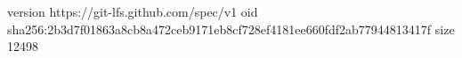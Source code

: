 version https://git-lfs.github.com/spec/v1
oid sha256:2b3d7f01863a8cb8a472ceb9171eb8cf728ef4181ee660fdf2ab77944813417f
size 12498
